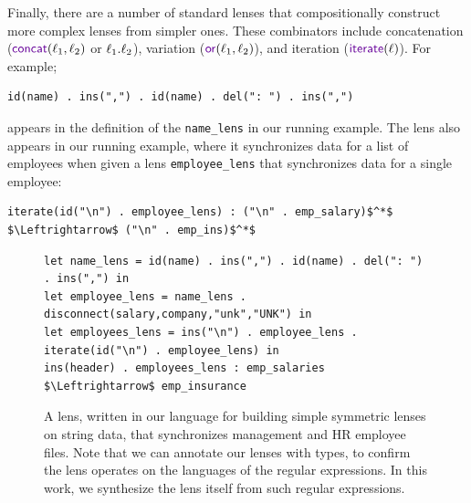 \documentclass[acmsmall,screen,anonymous]{acmart}
\begin{document}
Finally, there are a number of standard lenses that compositionally construct
more complex lenses from simpler ones. These combinators include concatenation
($\ConcatLensOf{\Lens_1}{\Lens_2}$ or $\mathit{\ell}_1 . \mathit{\ell}_2$), variation
($\OrLensOf{\Lens_1}{\Lens_2}$), and iteration ($\IterateLensOf{\Lens}$).  For example;
%
\begin{lstlisting}
id(name) . ins(",") . id(name) . del(": ") . ins(",")
\end{lstlisting}
%
appears in the definition of the \lstinline{name_lens} in our running example.
%
The \IterateLens lens also appears in our running example, where it
synchronizes data for a list of employees when given a
lens \lstinline{employee_lens} that synchronizes  data for a single employee:
%
\begin{lstlisting}
iterate(id("\n") . employee_lens) : ("\n" . emp_salary)$^*$ $\Leftrightarrow$ ("\n" . emp_ins)$^*$
\end{lstlisting}
%

\begin{figure}
\begin{lstlisting}
let name_lens = id(name) . ins(",") . id(name) . del(": ") . ins(",") in
let employee_lens = name_lens . disconnect(salary,company,"unk","UNK") in
let employees_lens = ins("\n") . employee_lens . iterate(id("\n") . employee_lens) in
ins(header) . employees_lens : emp_salaries $\Leftrightarrow$ emp_insurance
\end{lstlisting}
  \caption{A lens, written in our language for building simple symmetric lenses
    on string data, that synchronizes management and HR employee files.
    Note that we can annotate our lenses with types, to confirm the lens
    operates on the languages of the regular expressions. In this work, we
    synthesize the lens itself from such regular expressions.}
  \label{fig:example_lens}
\end{figure}
\end{document}
